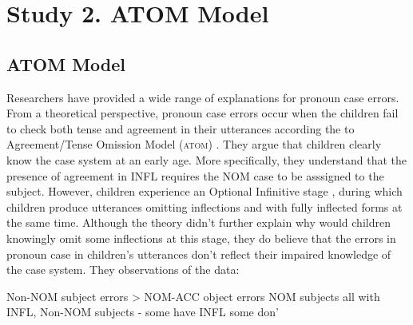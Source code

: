 \section{Study 2. ATOM Model}
\subsection{ATOM Model}
Researchers have provided a wide range of explanations for pronoun case errors. From a theoretical perspective, pronoun case errors occur when the children fail to check both tense and agreement in their utterances according the to Agreement/Tense Omission Model (\textsc{atom}) \citep{wexler1998very,wexler1998subject}. They argue that children clearly know the case system at an early age. More specifically, they understand that the presence of agreement in INFL requires the NOM case to be asssigned to the subject. However, children experience an Optional Infinitive stage \citep{wexler199414}, during which children produce utterances omitting inflections and with fully inflected forms at the same time. Although the theory didn't further explain why would children knowingly omit some inflections at this stage, they do believe that the errors in pronoun case in children's utterances don't reflect their impaired knowledge of the case system. They observations of the data:
\begin{exe}
\ex Non-NOM subject errors > NOM-ACC object errors 
\ex NOM subjects all with INFL, Non-NOM subjects - some have INFL some don'
\end{exe}

